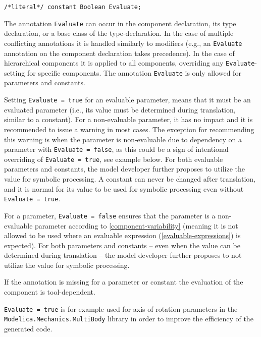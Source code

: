 \begin{annotationdefinition}[Evaluate]
\begin{synopsis}\begin{lstlisting}
/*literal*/ constant Boolean Evaluate;
\end{lstlisting}\end{synopsis}
\begin{semantics}
The annotation \lstinline!Evaluate! can occur in the component declaration, its type declaration, or a base class of the type-declaration.
In the case of multiple conflicting annotations it is handled similarly to modifiers (e.g., an \lstinline!Evaluate! annotation on the component declaration takes precedence).
In the case of hierarchical components it is applied to all components, overriding any \lstinline!Evaluate!-setting for specific components.
The annotation \lstinline!Evaluate! is only allowed for parameters and constants.

Setting \lstinline!Evaluate = true! for an evaluable parameter, means that it must be an evaluated parameter (i.e., its value must be determined during translation, similar to a constant).
For a non-evaluable parameter, it has no impact and it is recommended to issue a warning in most cases.
The exception for recommending this warning is when the parameter is non-evaluable due to dependency on a parameter with \lstinline!Evaluate = false!, as this could be a sign of intentional overriding of \lstinline!Evaluate = true!, see example below.
For both evaluable parameters and constants, the model developer further proposes to utilize the value for symbolic processing.
A constant can never be changed after translation, and it is normal for its value to be used for symbolic processing even without \lstinline!Evaluate = true!.

For a parameter, \lstinline!Evaluate = false! ensures that the parameter is a non-evaluable parameter according to \cref{component-variability} (meaning it is not allowed to be used where an evaluable expression (\cref{evaluable-expressions}) is expected).
For both parameters and constants -- even when the value can be determined during translation -- the model developer further proposes to not utilize the value for symbolic processing.

If the annotation is missing for a parameter or constant the evaluation of the component is tool-dependent.

\begin{nonnormative}
\lstinline!Evaluate = true! is for example used for axis of rotation parameters in the \lstinline!Modelica.Mechanics.MultiBody! library in order to improve the efficiency of the generated code.


\end{nonnormative}
\end{semantics}
\end{annotationdefinition}
